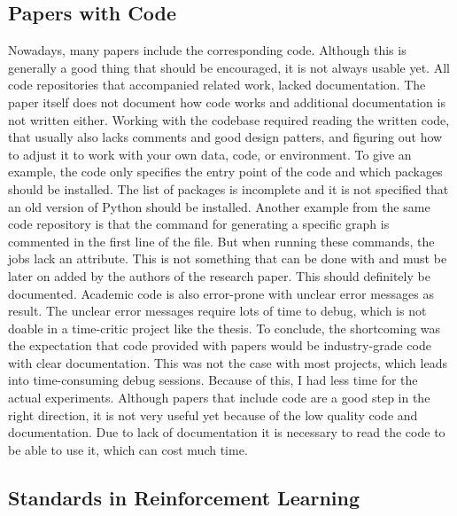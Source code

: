 \subsection{Papers with Code}

Nowadays, many papers include the corresponding
code. Although this is generally a good thing
that should be encouraged, it is not always usable yet. All code repositories
that accompanied related work, lacked documentation. The paper itself does not
document how code works and additional documentation is not written either.
Working with the codebase required reading the written code, that usually also
lacks comments and good design patters, and figuring out how to adjust it to
work with your own data, code, or environment. To give an example, the \mrlco
code only specifies the entry
point of the code and which packages should be installed. The list of packages
is incomplete and it is not specified that an old version of Python should be
installed. Another example from the same code repository is that the command
for generating a specific graph is commented in the first line of the file.
But when running these commands, the jobs lack an 
attribute. This is not something that can be done with  and must
be later on added by the authors of the research paper. This should definitely
be documented. Academic code is also error-prone with unclear error messages as
result. The unclear error messages require lots of time to debug, which is not
doable in a time-critic project like the thesis. To conclude, the shortcoming
was the expectation that code provided with papers would be industry-grade
code with clear documentation. This was not the case with most projects, which
leads into time-consuming debug sessions. Because of this, I had less time for
the actual experiments. Although papers that include code are a good step in
the right direction, it is not very useful yet because of the low quality code
and documentation. Due to lack of documentation it is necessary to read the
code to be able to use it, which can cost much time.


\subsection{Standards in Reinforcement Learning}\label{sec:standards}

